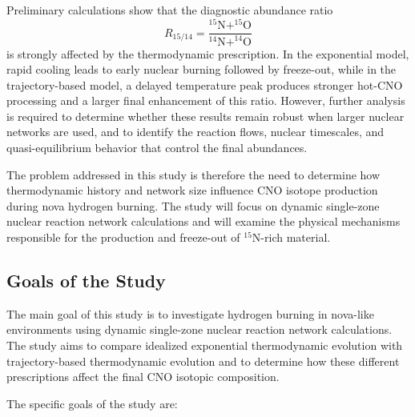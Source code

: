 Preliminary calculations show that the diagnostic abundance ratio
\[
R_{15/14} =
\frac{^{15}\mathrm{N}+^{15}\mathrm{O}}
{^{14}\mathrm{N}+^{14}\mathrm{O}}
\]
is strongly affected by the thermodynamic prescription. In the exponential model, rapid cooling leads to early nuclear burning followed by freeze-out, while in the trajectory-based model, a delayed temperature peak produces stronger hot-CNO processing and a larger final enhancement of this ratio. However, further analysis is required to determine whether these results remain robust when larger nuclear networks are used, and to identify the reaction flows, nuclear timescales, and quasi-equilibrium behavior that control the final abundances.

The problem addressed in this study is therefore the need to determine how thermodynamic history and network size influence CNO isotope production during nova hydrogen burning. The study will focus on dynamic single-zone nuclear reaction network calculations and will examine the physical mechanisms responsible for the production and freeze-out of $^{15}\mathrm{N}$-rich material.

\subsection{Goals of the Study}

The main goal of this study is to investigate hydrogen burning in nova-like environments using dynamic single-zone nuclear reaction network calculations. The study aims to compare idealized exponential thermodynamic evolution with trajectory-based thermodynamic evolution and to determine how these different prescriptions affect the final CNO isotopic composition.

The specific goals of the study are:

